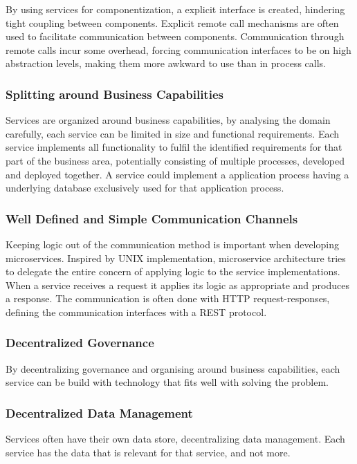 By using services for componentization, a explicit interface is created, hindering tight coupling between components. Explicit remote call mechanisms are often used to facilitate communication between components. Communication through remote calls incur some overhead, forcing communication interfaces to be on high abstraction levels, making them more awkward to use than in process calls.

\subsubsection*{Splitting around Business Capabilities}
Services are organized around business capabilities, by analysing the domain carefully, each service can be limited in size and functional requirements. Each service implements all functionality to fulfil the identified requirements for that part of the business area, potentially consisting of multiple processes, developed and deployed together. A service could implement a application process having a underlying database exclusively used for that application process\cite{fowler2014microservices}.

\subsubsection*{Well Defined and Simple Communication Channels}
Keeping logic out of the communication method is important when developing microservices. Inspired by UNIX implementation, microservice architecture tries to delegate the entire concern of applying logic to the service implementations. When a service receives a request it applies its logic as appropriate and produces a response. The communication is often done with HTTP request-responses, defining the communication interfaces with a REST protocol\cite{fowler2014microservices}.

\subsubsection*{Decentralized Governance}
By decentralizing governance and organising around business capabilities, each service can be build with technology that fits well with solving the problem.

\subsubsection*{Decentralized Data Management}
Services often have their own data store, decentralizing data management. Each service has the data that is relevant for that service, and not more. 

